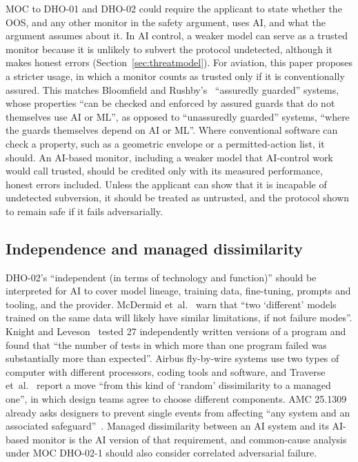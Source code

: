 \documentclass[11pt]{article}
\begin{document}
MOC to DHO-01 and DHO-02 could require the applicant to state whether the OOS, and any other monitor in the safety argument, uses AI, and what the argument assumes about it. In AI control, a weaker model can serve as a trusted monitor because it is unlikely to subvert the protocol undetected, although it makes honest errors (Section~\ref{sec:threatmodel}). For aviation, this paper proposes a stricter usage, in which a monitor counts as trusted only if it is conventionally assured. This matches Bloomfield and Rushby's~\cite[Section~2.2]{bloomfield2024assurance} ``assuredly guarded'' systems, whose properties ``can be checked and enforced by assured guards that do not themselves use AI or ML'', as opposed to ``unassuredly guarded'' systems, ``where the guards themselves depend on AI or ML''. Where conventional software can check a property, such as a geometric envelope or a permitted-action list, it should. An AI-based monitor, including a weaker model that AI-control work would call trusted, should be credited only with its measured performance, honest errors included. Unless the applicant can show that it is incapable of undetected subversion, it should be treated as untrusted, and the protocol shown to remain safe if it fails adversarially.

\subsection{Independence and managed dissimilarity}\label{sec:independence}

DHO-02's ``independent (in terms of technology and function)'' should be interpreted for AI to cover model lineage, training data, fine-tuning, prompts and tooling, and the provider. McDermid et~al.~\cite{mcdermid2024upstream} warn that ``two `different' models trained on the same data will likely have similar limitations, if not failure modes''. Knight and Leveson~\cite{knight1986independence} tested 27 independently written versions of a program and found that ``the number of tests in which more than one program failed was substantially more than expected''. Airbus fly-by-wire systems use two types of computer with different processors, coding tools and software, and Traverse et~al.~\cite[Section~3.2]{traverse2006airbus} report a move ``from this kind of `random' dissimilarity to a managed one'', in which design teams agree to choose different components. AMC 25.1309 already asks designers to prevent single events from affecting ``any system and an associated safeguard''~\cite[para.~11.c]{easa2021amc25}. Managed dissimilarity between an AI system and its AI-based monitor is the AI version of that requirement, and common-cause analysis under MOC DHO-02-1 should also consider correlated adversarial failure.
\end{document}
